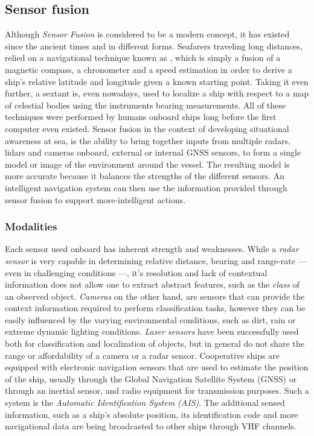 \subsection{Sensor fusion}
Although \emph{Sensor Fusion} is considered to be a modern concept, it has existed since the ancient times and in different forms. Seafarers traveling long distances, relied on a navigational technique known as \emph{}, which is simply a fusion of a magnetic compass, a chronometer and a speed estimation in order to derive a ship's relative latitude and longitude given a known starting point. Taking it even further, a sextant is, even nowadays, used to localize a ship with respect to a map of celestial bodies using the instruments bearing measurements. All of these techniques were performed by humans onboard ships long before the first computer even existed. Sensor fusion in the context of developing situational awareness at sea, is the ability to bring together inputs from multiple radars, lidars and cameras onboard, external or internal GNSS sensors, to form a single model or image of the environment around the vessel. The resulting model is more accurate because it balances the strengths of the different sensors. An intelligent navigation system can then use the information provided through sensor fusion to support more-intelligent actions.
\subsubsection{Modalities}
Each sensor used onboard has inherent strength and weaknesses.  While a \emph{radar sensor} is very capable in determining relative distance, bearing and range-rate --- even in challenging conditions ---, it's resolution and lack of contextual information does not allow one to extract abstract features, such as the \emph{class} of an observed object. \emph{Cameras} on the other hand, are sensors that can provide the context information required to perform classification tasks, however they can be easily influenced by the varying environmental conditions, such as dirt, rain or extreme dynamic lighting conditions. \emph{Laser sensors} have been successfully used both for classification and localization of objects, but in general do not share the range or affordability of a camera or a radar sensor. Cooperative ships are equipped with electronic navigation sensors that are used to estimate the position of the ship, usually through the Global Navigation Satellite System (GNSS) or through an inertial sensor, and radio equipment for transmission purposes. Such a system is the \emph{Automatic Identification System (AIS)}. The additional sensed information, such as a ship's absolute position, its identification code and more navigational data are being broadcasted to other ships through VHF channels.

